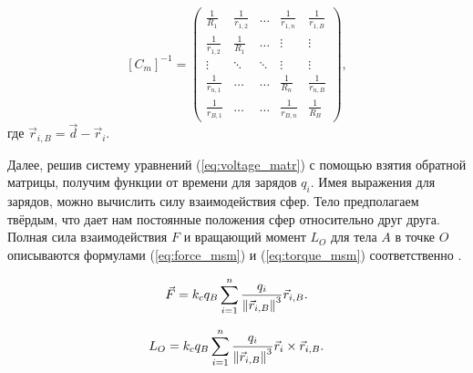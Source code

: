 \begin{equation}
\label{eq:cm_inv}
	[C_m]^{-1} = 
	\begin{pmatrix}
		\frac{1}{R_1}	&	\frac{1}{r_{1,2}}	&	\dots		&	\frac{1}{r_{1,n}}	&	\frac{1}{r_{1,B}} \\
		\frac{1}{r_{1,2}}	&	\frac{1}{R_1}	&	\dots		&	\vdots		&	\vdots \\
		\vdots		&	\ddots		&	\ddots	&	\vdots		&	\vdots \\
		\frac{1}{r_{n,1}}	&	\dots			&	\dots		&	\frac{1}{R_n}	&	\frac{1}{r_{n,B}} \\
		\frac{1}{r_{B,1}}	&	\dots			&	\dots		&	\frac{1}{r_{B,n}}	&	\frac{1}{R_B}
	\end{pmatrix},
\end{equation}
где $\vec{r}_{i,B} = \vec{d} - \vec{r}_i$.

Далее, решив систему уравнений (\ref{eq:voltage_matr}) с помощью взятия обратной матрицы, получим функции от времени для зарядов $q_i$.
Имея выражения для зарядов, можно вычислить силу взаимодействия сфер.
Тело предполагаем твёрдым, что дает нам постоянные положения сфер относительно друг друга.
Полная сила взаимодействия $F$ и вращающий момент $L_O$ для тела $A$ в точке $O$ описываются формулами (\ref{eq:force_msm}) и (\ref{eq:torque_msm}) соответственно \cite{msm}.

\begin{equation}
\label{eq:force_msm}
	\vec{F} = k_c q_B \sum_{i=1}^n \frac{q_i}{\left\lVert\vec{r}_{i,B}\right\rVert^3}\vec{r}_{i,B}.
\end{equation}

\begin{equation}
\label{eq:torque_msm}
	L_O = k_c q_B \sum_{i=1}^n \frac{q_i}{\left\lVert\vec{r}_{i,B}\right\rVert^3} \vec{r}_i \times \vec{r}_{i,B}.
\end{equation}